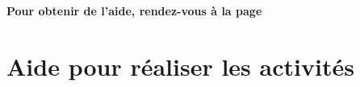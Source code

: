 \begin{center}\label{modelePage5e3}\end{center}

\textbf{Pour obtenir de l'aide, rendez-vous à la page \pageref{aide_seancesWord}}

\vfill
\phantom{rien}














\newpage

\section{Aide pour réaliser les activités}\label{aide_seancesWord}

